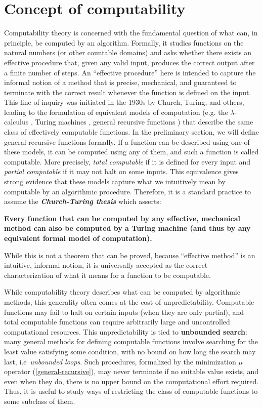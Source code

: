 \documentclass{pracalicmgr2025}
\theoremstyle{plain}            %
\theoremstyle{remark}           %
\theoremstyle{definition}       %
\begin{document}
    \section{Concept of computability}
Computability theory is concerned with the fundamental question of what can, in principle, be computed by an algorithm. Formally, it studies functions on the natural numbers (or other countable domains) and asks whether there exists an effective procedure that, given any valid input, produces the correct output after a finite number of steps. An “effective procedure” here is intended to capture the informal notion of a method that is precise, mechanical, and guaranteed to terminate with the correct result whenever the function is defined on the input. This line of inquiry was initiated in the 1930s by Church, Turing, and others, leading to the formulation of equivalent models of computation (e.g. the $\lambda$-calculus \cite{barendregt1984introduction}, Turing machines \cite{rogers1987theoryTURING}, general recursive functions \cite{kleene1936general, rogers1987theoryTURING}) that describe the same class of effectively computable functions. In the preliminary section, we will define general recursive functions formally. If a function can be described using one of these models, it can be computed using any of them, and such a function is called computable. More precisely, \textit{total computable} if it is defined for every input and \textit{partial computable} if it may not halt on some inputs. This equivalence gives strong evidence that these models capture what we intuitively mean by computable by an algorithmic procedure. Therefore, it is a standard practice to assume the \textbf{\textit{Church-Turing thesis}} which asserts:

\begin{center} \label{Church-Turing}
    \textbf{Every function that can be computed by any effective, mechanical method can also be computed by a Turing machine (and thus by any equivalent formal model of computation).}
\end{center}

While this is not a theorem that can be proved, because “effective method” is an intuitive, informal notion, it is universally accepted as the correct characterization of what it means for a function to be computable.

While computability theory describes what can be computed by algorithmic methods, this generality often comes at the cost of unpredictability. Computable functions may fail to halt on certain inputs (when they are only partial), and total computable functions can require arbitrarily large and uncontrolled computational resources. This unpredictability is tied to \textbf{unbounded search}: many general methods for defining computable functions involve searching for the least value satisfying some condition, with no bound on how long the search may last, i.e\ \textit{unbounded loops}. Such procedures, formalized by the minimization $\mu$ operator (\ref{general-recursive}), may never terminate if no suitable value exists, and even when they do, there is no upper bound on the computational effort required. Thus, it is useful to study ways of restricting the class of computable functions to some subclass of them. 
\end{document}
